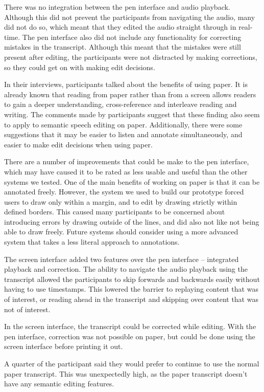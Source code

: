 There was no integration between the pen interface and audio playback. Although this did not prevent the participants
from navigating the audio, many did not do so, which meant that they edited the audio straight through in real-time. 
The pen interface also did not include any functionality for correcting mistakes in the transcript. Although this meant
that the mistakes were still present after editing, the participants were not distracted by making corrections, so they
could get on with making edit decisions.

In their interviews, participants talked about the benefits of using paper. It is already known that reading from paper
rather than from a screen allows readers to gain a deeper understanding, cross-reference and interleave reading and
writing.  The comments made by participants suggest that these finding also seem to apply to semantic speech editing on
paper. Additionally, there were some suggestions that it may be easier to listen and annotate simultaneously, and
easier to make edit decisions when using paper.

There are a number of improvements that could be make to the pen interface, which may have caused it to be rated as
less usable and useful than the other systems we tested. One of the main benefits of working on
paper is that it can be annotated freely. However, the system we used to build our prototype forced users to draw only
within a margin, and to edit by drawing strictly within defined borders. This caused many participants to be concerned
about introducing errors by drawing outside of the lines, and did also not like not being able to draw freely.
Future systems should consider using a more advanced system that takes a less literal approach to annotations.

The screen interface added two features over the pen interface -- integrated playback and correction. The ability to
navigate the audio playback using the transcript allowed the participants to skip forwards and backwards easily
without having to use timestamps. This lowered the barrier to replaying content that was of interest, or reading ahead
in the transcript and skipping over content that was not of interest.

In the screen interface, the transcript could be corrected while editing. With the pen interface, correction was not
possible on paper, but could be done using the screen interface before printing it out.

A quarter of the participant said they would prefer to continue to use the normal paper transcript. This was
unexpectedly high, as the paper transcript doesn't have any semantic editing features.


